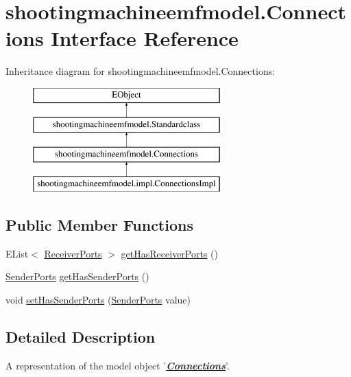 \hypertarget{interfaceshootingmachineemfmodel_1_1_connections}{\section{shootingmachineemfmodel.\-Connections Interface Reference}
\label{interfaceshootingmachineemfmodel_1_1_connections}
}
Inheritance diagram for shootingmachineemfmodel.\-Connections\-:\begin{figure}[H]
\begin{center}
\leavevmode
\includegraphics[height=4.000000cm]{interfaceshootingmachineemfmodel_1_1_connections}
\end{center}
\end{figure}
\subsection*{Public Member Functions}
\begin{DoxyCompactItemize}
\item 
E\-List$<$ \hyperlink{interfaceshootingmachineemfmodel_1_1_receiver_ports}{Receiver\-Ports} $>$ \hyperlink{interfaceshootingmachineemfmodel_1_1_connections_a8cfde1575aba85588b15c4ff3c85d1a0}{get\-Has\-Receiver\-Ports} ()
\item 
\hyperlink{interfaceshootingmachineemfmodel_1_1_sender_ports}{Sender\-Ports} \hyperlink{interfaceshootingmachineemfmodel_1_1_connections_a72c244c761fab2a9f2c14e30f326e388}{get\-Has\-Sender\-Ports} ()
\item 
void \hyperlink{interfaceshootingmachineemfmodel_1_1_connections_ad5662ccb46db1e1ea5ad8319a7a96de7}{set\-Has\-Sender\-Ports} (\hyperlink{interfaceshootingmachineemfmodel_1_1_sender_ports}{Sender\-Ports} value)
\end{DoxyCompactItemize}


\subsection{Detailed Description}
A representation of the model object '{\itshape {\bfseries \hyperlink{interfaceshootingmachineemfmodel_1_1_connections}{Connections}}}'.

